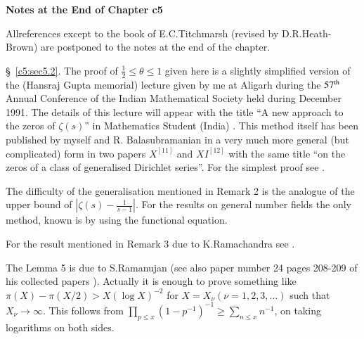 \newpage

\begin{center}
{\large\bf Notes at the End of Chapter c5}
\end{center}
\smallskip

All\pageoriginale references except to the book of E.C.\@ Titchmarsh
\cite{Titchmarsh1} (revised by D.R.\@ Heath-Brown) are postponed to the notes
at the end of the chapter.

\S\ \ref{c5:sec5.2}. The proof of $\frac{1}{2}\leq \theta\leq 1$
given here is a slightly simplified version of the (Hansraj Gupta
memorial) lecture given by me at Aligarh during the $57^{\rm th}$ Annual
Conference of the Indian Mathematical Society held during December
1991. The details of this lecture will appear with the title ``A new
approach to the zeros of $\zeta(s)$'' in Mathematics Student (India)
\cite{Balasubramanian and Ramachandra19}. This method itself has been published by myself and R.\@
Balasubramanian in a very much more general (but complicated) form in
two papers $X^{[11]}$ and $XI^{[12]}$ with the same title ``on the
zeros of a class of generalised Dirichlet series''. For the simplest
proof see \cite{Ramachandra26}.

The difficulty of the generalisation mentioned in Remark 2 is the
analogue of the upper bound of $|\zeta(s)-\frac{1}{s-1}|$. For the
results on general number fields the only method, known is by using
the functional equation.

For the result mentioned in Remark 3 due to K.\@ Ramachandra see
\cite{Ramachandra20}.

The Lemma 5 is due to S.\@ Ramanujan \cite{Ramanujan1} (see also paper
number 24 pages 208-209 of his collected papers \cite{Ramanujan2}). Actually
it is enough to prove something like $\pi(X)-\pi(X/2)>X(\log X)^{-2}$
for $X=X_{\nu}(\nu=1,2,3,\ldots)$ such that $X_{\nu}\to \infty$. This
follows from $\prod\limits_{p\leq x}(1-p^{-1})^{-1}\geq
\sum\limits_{n\leq x}n^{-1}$, on taking logarithms on both sides.

